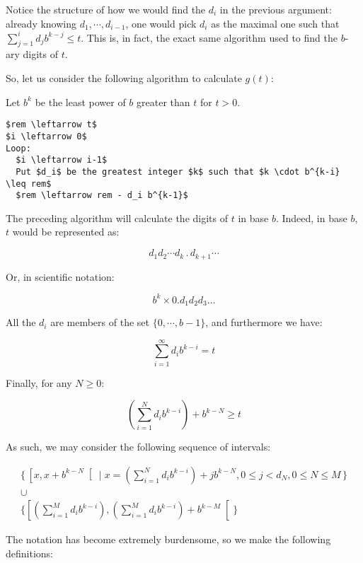 \documentclass[11pt]{amsart}
\begin{document}
\bigskip

Notice the structure of how we would find the $d_i$ in the previous argument: already knowing $d_1, \cdots, d_{i-1}$, one would pick $d_i$ as the maximal one such that $\sum_{j = 1}^i d_j b^{k-j} \leq t$. This is, in fact, the exact same algorithm used to find the $b$-ary digits of $t$.

So, let us consider the following algorithm to calculate $g(t)$:

Let $b^k$ be the least power of $b$ greater than $t$ for $t > 0$.

\begin{lstlisting}
$rem \leftarrow t$
$i \leftarrow 0$
Loop:
  $i \leftarrow i-1$
  Put $d_i$ be the greatest integer $k$ such that $k \cdot b^{k-i} \leq rem$
  $rem \leftarrow rem - d_i b^{k-1}$
\end{lstlisting}
\label{digalg}

The preceding algorithm will calculate the digits of $t$ in base $b$. Indeed, in base $b$, $t$ would be represented as:

\[d_1 d_2 \cdots d_k \, . \, d_{k+1} \cdots\]

Or, in scientific notation:

\[b^k \times 0.d_1 d_2 d_3 \dots\]

All the $d_i$ are members of the set $\{ 0, \cdots, b-1\}$, and furthermore we have:

\[\sum_{i = 1}^\infty d_i b^{k-i} = t\]

Finally, for any $N \geq 0$:

\[(\sum_{i=1}^N d_i b^{k-i}) + b^{k-N} \geq t\]

As such, we may consider the following sequence of intervals:

\begin{gather*}
\{\, \left[ x , x + b^{k-N} \right[ \mid x = (\sum_{i=1}^N d_i b^{k-i}) + j b^{k-N}, 0 \leq j < d_N, 0 \leq N \leq M\,\}\\
\cup\\
\{\left[ (\sum_{i=1}^M d_i b^{k-i}) ,(\sum_{i=1}^M d_i b^{k-i}) + b^{k-M} \right[\}
\end{gather*}

The notation has become extremely burdensome, so we make the following definitions:
\end{document}
